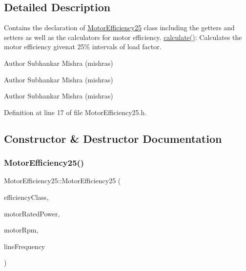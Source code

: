 \subsection{Detailed Description}
Contains the declaration of \hyperlink{class_motor_efficiency25}{Motor\+Efficiency25} class including the getters and setters as well as the calculators for motor efficiency. \hyperlink{class_motor_efficiency25_a2421a96d011677172f43d9929b250188}{calculate()}\+: Calculates the motor efficiency givenat 25\% intervals of load factor. 

\begin{DoxyAuthor}{Author}
Subhankar Mishra (mishras) 
\end{DoxyAuthor}


\begin{DoxyAuthor}{Author}
Subhankar Mishra (mishras) 
\end{DoxyAuthor}


\begin{DoxyAuthor}{Author}
Subhankar Mishra (mishras) 
\end{DoxyAuthor}


Definition at line 17 of file Motor\+Efficiency25.\+h.



\subsection{Constructor \& Destructor Documentation}
\mbox{\label{class_motor_efficiency25_a8e03995de84c89195fdbb250958321bc}} 
\subsubsection{\texorpdfstring{Motor\+Efficiency25()}{MotorEfficiency25()}\hspace{0.1cm}{\footnotesize\ttfamily [1/3]}}
{\footnotesize\ttfamily Motor\+Efficiency25\+::\+Motor\+Efficiency25 (\begin{DoxyParamCaption}\item[{\hyperlink{class_motor_afa022971ae062406a9f588c601673d4e}{Motor\+::\+Efficiency\+Class}}]{efficiency\+Class,  }\item[{double}]{motor\+Rated\+Power,  }\item[{double}]{motor\+Rpm,  }\item[{\hyperlink{class_motor_acee1bdf1b684ad36cb80dc2829d9fcee}{Motor\+::\+Line\+Frequency}}]{line\+Frequency }\end{DoxyParamCaption})\hspace{0.3cm}{\ttfamily [inline]}}

